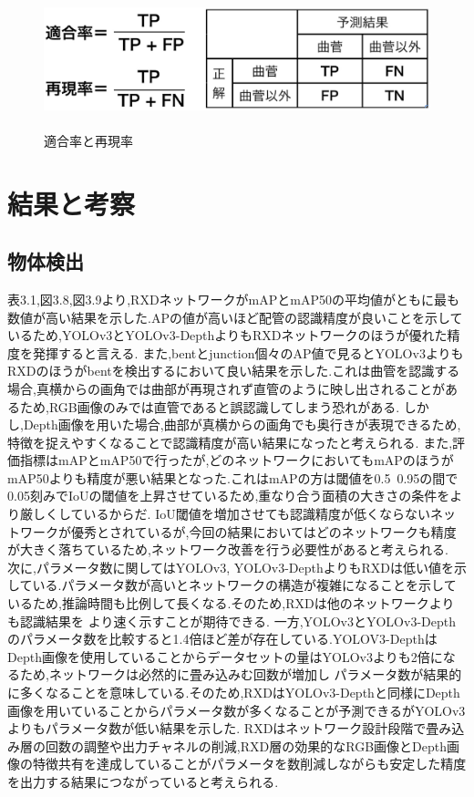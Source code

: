 \begin{figure}[htbt]
	\centering
	 \includegraphics[height=40mm]{recall.eps}
	 \caption{適合率と再現率}
	 \label{fig:f2}
\end{figure}

\section{結果と考察}
\subsection{物体検出}
表3.1,図3.8,図3.9より,RXDネットワークがmAPとmAP50の平均値がともに最も数値が高い結果を示した.APの値が高いほど配管の認識精度が良いことを示しているため,YOLOv3とYOLOv3-DepthよりもRXDネットワークのほうが優れた精度を発揮すると言える.
また,bentとjunction個々のAP値で見るとYOLOv3よりもRXDのほうがbentを検出するにおいて良い結果を示した.これは曲管を認識する場合,真横からの画角では曲部が再現されず直管のように映し出されることがあるため,RGB画像のみでは直管であると誤認識してしまう恐れがある.
しかし,Depth画像を用いた場合,曲部が真横からの画角でも奥行きが表現できるため,特徴を捉えやすくなることで認識精度が高い結果になったと考えられる.
また,評価指標はmAPとmAP50で行ったが,どのネットワークにおいてもmAPのほうがmAP50よりも精度が悪い結果となった.これはmAPの方は閾値を0.5~0.95の間で0.05刻みでIoUの閾値を上昇させているため,重なり合う面積の大きさの条件をより厳しくしているからだ.
IoU閾値を増加させても認識精度が低くならないネットワークが優秀とされているが,今回の結果においてはどのネットワークも精度が大きく落ちているため,ネットワーク改善を行う必要性があると考えられる.\\
次に,パラメータ数に関してはYOLOv3, YOLOv3-DepthよりもRXDは低い値を示している.パラメータ数が高いとネットワークの構造が複雑になることを示しているため,推論時間も比例して長くなる.そのため,RXDは他のネットワークよりも認識結果を
より速く示すことが期待できる.
一方,YOLOv3とYOLOv3-Depthのパラメータ数を比較すると1.4倍ほど差が存在している.YOLOV3-DepthはDepth画像を使用していることからデータセットの量はYOLOv3よりも2倍になるため,ネットワークは必然的に畳み込みむ回数が増加し
パラメータ数が結果的に多くなることを意味している.そのため,RXDはYOLOv3-Depthと同様にDepth画像を用いていることからパラメータ数が多くなることが予測できるがYOLOv3よりもパラメータ数が低い結果を示した.
RXDはネットワーク設計段階で畳み込み層の回数の調整や出力チャネルの削減,RXD層の効果的なRGB画像とDepth画像の特徴共有を達成していることがパラメータを数削減しながらも安定した精度を出力する結果につながっていると考えられる.\\





